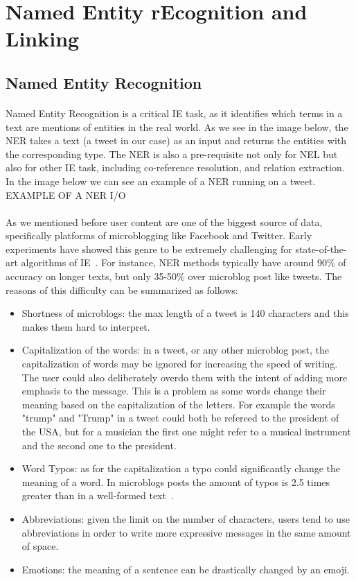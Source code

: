 \section{Named Entity rEcognition and Linking}
\subsection{Named Entity Recognition}
\paragraph{}
Named Entity Recognition is a critical IE task, as it identifies which terms in a text are mentions of entities in the real world.
As we see in the image below, the NER takes a text (a tweet in our case) as an input and returns the entities with the corresponding type. The NER is also a pre-requisite not only for NEL but also for other IE task, including co-reference resolution, and relation extraction. In the image below we can see an example of a NER running on a tweet. \\
\newline
EXAMPLE OF A NER I/O

\paragraph{}
As we mentioned before user content are one of the biggest source of data, specifically platforms of microblogging like Facebook and Twitter. Early experiments have showed this genre to be extremely challenging for state-of-the-art algorithms of IE~\cite{derczynski2013microblog}. For instance, NER methods typically have around 90\% of accuracy on longer texts, but only 35-50\% over microblog post like tweets. The reasons of this difficulty can be summarized as follows:

\begin{itemize}[itemsep = 0.1em]
\item Shortness of microblogs: the max length of a tweet is 140 characters and this makes them hard to interpret.
\item Capitalization of the words: in a tweet, or any other microblog post, the capitalization of words may be ignored for increasing the speed of writing. The user could also deliberately overdo them with the intent of adding more emphasis to the message. This is a problem as some words change their meaning based on the capitalization of the letters. For example the words "trump" and "Trump" in a tweet could both be refereed to the president of the USA, but for a musician the first one might refer to a musical instrument and the second one to the president.
\item Word Typos: as for the capitalization a typo could significantly change the meaning of a word. In microblogs posts the amount of typos is 2.5 times greater than in a well-formed text~\cite{derczynski2015analysis}.
\item Abbreviations: given the limit on the number of characters, users tend to use abbreviations in order to write more expressive messages in the same amount of space.
\item Emotions: the meaning of a sentence can be drastically changed by an emoji. 
\end{itemize}
